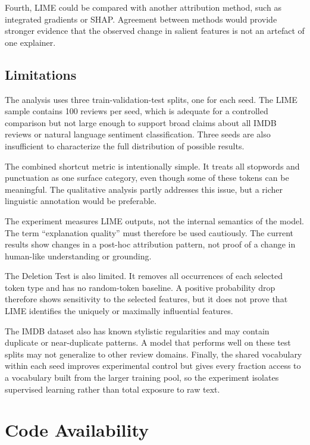 \documentclass[11pt]{article}
\begin{document}
Fourth, LIME could be compared with another attribution method, such as integrated gradients or SHAP. Agreement between methods would provide stronger evidence that the observed change in salient features is not an artefact of one explainer.

\subsection{Limitations}

The analysis uses three train-validation-test splits, one for each seed. The LIME sample contains 100 reviews per seed, which is adequate for a controlled comparison but not large enough to support broad claims about all IMDB reviews or natural language sentiment classification. Three seeds are also insufficient to characterize the full distribution of possible results.

The combined shortcut metric is intentionally simple. It treats all stopwords and punctuation as one surface category, even though some of these tokens can be meaningful. The qualitative analysis partly addresses this issue, but a richer linguistic annotation would be preferable.

The experiment measures LIME outputs, not the internal semantics of the model. The term ``explanation quality'' must therefore be used cautiously. The current results show changes in a post-hoc attribution pattern, not proof of a change in human-like understanding or grounding.

The Deletion Test is also limited. It removes all occurrences of each selected token type and has no random-token baseline. A positive probability drop therefore shows sensitivity to the selected features, but it does not prove that LIME identifies the uniquely or maximally influential features.

The IMDB dataset also has known stylistic regularities and may contain duplicate or near-duplicate patterns. A model that performs well on these test splits may not generalize to other review domains. Finally, the shared vocabulary within each seed improves experimental control but gives every fraction access to a vocabulary built from the larger training pool, so the experiment isolates supervised learning rather than total exposure to raw text.

\section*{Code Availability}
\end{document}

